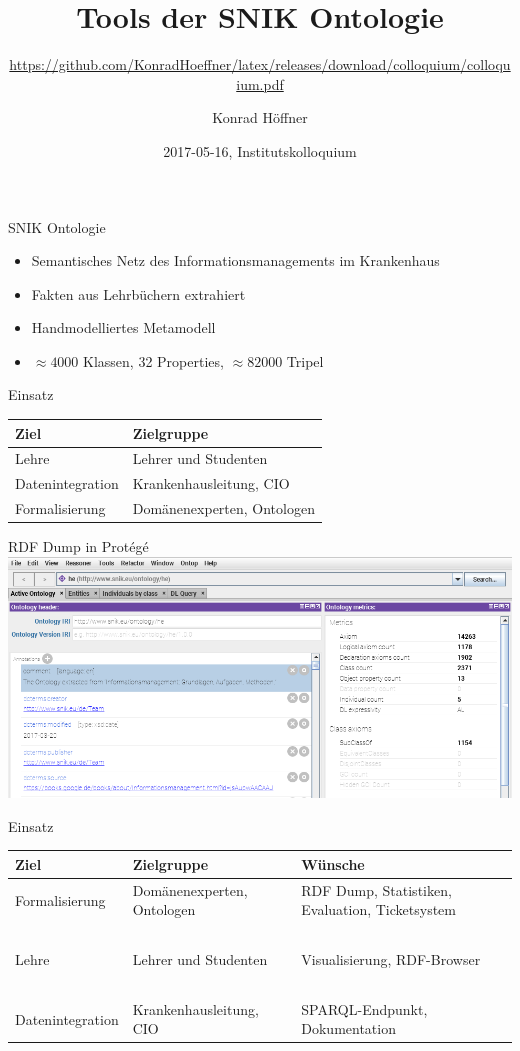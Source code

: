 \documentclass{beamer}
\author{Konrad Höffner}
\date{2017-05-16, Institutskolloquium}
\title{Tools der SNIK Ontologie}
\subtitle{\url{https://github.com/KonradHoeffner/latex/releases/download/colloquium/colloquium.pdf}}
\begin{document}
\begin{frame}
\titlepage
\end{frame}

\begin{frame}{SNIK Ontologie}
\begin{itemize}
\item Semantisches Netz des Informationsmanagements im Krankenhaus
\item Fakten aus Lehrbüchern extrahiert
\item Handmodelliertes Metamodell
\item $\approx \num{4000}$ Klassen, 32 Properties, $\approx \num{82000}$ Tripel
\end{itemize}
\end{frame}

\begin{frame}{Einsatz}
\begin{tabular}{ll}
\toprule
\textbf{Ziel}	&\textbf{Zielgruppe}\\
\midrule
Lehre			&Lehrer und Studenten\\ 
Datenintegration	&Krankenhausleitung, CIO\\
Formalisierung		&Domänenexperten, Ontologen\\
\bottomrule
\end{tabular}
\end{frame}

\begin{frame}{RDF Dump in Protégé}
\includegraphics[width=\textwidth]{img/protege.png}
\end{frame}

\begin{frame}{Einsatz}
\begin{tabulary}{\textwidth}{lLL}
\toprule
\textbf{Ziel}		&\textbf{Zielgruppe}		&\textbf{Wünsche}\\
\midrule
Formalisierung		&Domänenexperten, Ontologen	&RDF Dump, Statistiken, Evaluation, Ticketsystem\\
~\\
Lehre			&Lehrer und Studenten		&Visualisierung, RDF-Browser\\
~\\
Datenintegration	&Krankenhausleitung, CIO	&SPARQL-Endpunkt, Dokumentation\\
\bottomrule
\end{tabulary}
\end{frame}
\end{document}
